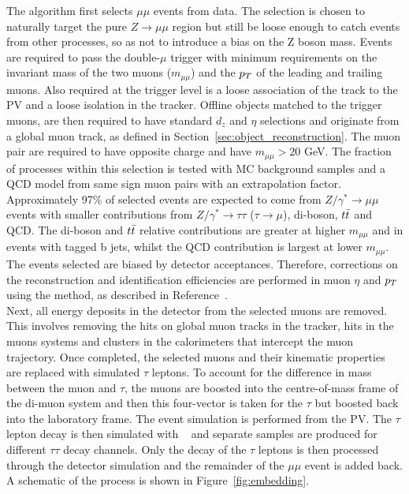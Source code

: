 The algorithm first selects $\mu\mu$ events from data.
The selection is chosen to naturally target the pure $Z \rightarrow \mu\mu$ region but still be loose enough to catch events from other processes, so as not to introduce a bias on the Z boson mass.
Events are required to pass the double-$\mu$ trigger with minimum requirements on the invariant mass of the two muons ($m_{\mu\mu}$) and the $p_{T}$ of the leading and trailing muons.
Also required at the trigger level is a loose association of the track to the \ac{PV} and a loose isolation in the tracker.
Offline objects matched to the trigger muons, are then required to have standard $d_z$ and $\eta$ selections and originate from a global muon track, as defined in Section~\ref{sec:object_reconstruction}.
The muon pair are required to have opposite charge and have $m_{\mu\mu} > 20$ GeV.
The fraction of processes within this selection is tested with \ac{MC} background samples and a \ac{QCD} model from same sign muon pairs with an extrapolation factor.
Approximately 97\% of selected events are expected to come from $Z/\gamma^* \rightarrow \mu\mu$ events with smaller contributions from $Z/\gamma^* \rightarrow \tau\tau$ ($\tau\rightarrow\mu$), di-boson, $t\bar{t}$ and QCD.
The di-boson and $t\bar{t}$ relative contributions are greater at higher $m_{\mu\mu}$ and in events with tagged b jets, whilst the \ac{QCD} contribution is largest at lower $m_{\mu\mu}$.
The events selected are biased by detector acceptances. 
Therefore, corrections on the reconstruction and identification efficiencies are performed in muon $\eta$ and $p_{T}$ using the  method, as described in Reference~\cite{CMS:2010svw}. \\

Next, all energy deposits in the detector from the selected muons are removed.
This involves removing the hits on global muon tracks in the tracker, hits in the muons systems and clusters in the calorimeters that intercept the muon trajectory.
Once completed, the selected muons and their kinematic properties are replaced with simulated $\tau$ leptons.
To account for the difference in mass between the muon and $\tau$, the muons are boosted into the centre-of-mass frame of the di-muon system and then this four-vector is taken for the $\tau$ but boosted back into the laboratory frame.
The event simulation is performed from the \ac{PV}.
The $\tau$ lepton decay is then simulated with \PYTHIA~\cite{Sirunyan:2019dfx,Sjostrand:2014zea} and separate samples are produced for different $\tau\tau$ decay channels.
Only the decay of the $\tau$ leptons is then processed through the detector simulation and the remainder of the $\mu\mu$ event is added back.
A schematic of the process is shown in Figure~\ref{fig:embedding}. \\

